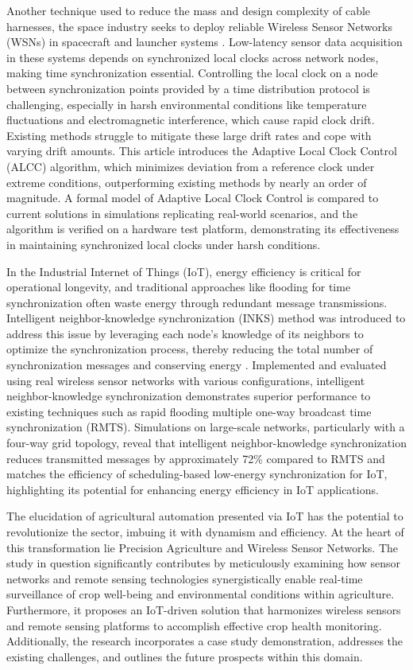 Another technique used to reduce the mass and design complexity of cable harnesses, the space industry seeks to deploy reliable Wireless Sensor Networks (WSNs) in spacecraft and launcher systems \cite{lubken2024adaptive}. Low-latency sensor data acquisition in these systems depends on synchronized local clocks across network nodes, making time synchronization essential. Controlling the local clock on a node between synchronization points provided by a time distribution protocol is challenging, especially in harsh environmental conditions like temperature fluctuations and electromagnetic interference, which cause rapid clock drift. Existing methods struggle to mitigate these large drift rates and cope with varying drift amounts. This article introduces the Adaptive Local Clock Control (ALCC) algorithm, which minimizes deviation from a reference clock under extreme conditions, outperforming existing methods by nearly an order of magnitude. A formal model of Adaptive Local Clock Control is compared to current solutions in simulations replicating real-world scenarios, and the algorithm is verified on a hardware test platform, demonstrating its effectiveness in maintaining synchronized local clocks under harsh conditions.

In the Industrial Internet of Things (IoT), energy efficiency is critical for operational longevity, and traditional approaches like flooding for time synchronization often waste energy through redundant message transmissions. Intelligent neighbor-knowledge synchronization (INKS) method was introduced to address this issue by leveraging each node's knowledge of its neighbors to optimize the synchronization process, thereby reducing the total number of synchronization messages and conserving energy \cite{jia2024low}. Implemented and evaluated using real wireless sensor networks with various configurations, intelligent neighbor-knowledge synchronization demonstrates superior performance to existing techniques such as rapid flooding multiple one-way broadcast time synchronization (RMTS). Simulations on large-scale networks, particularly with a four-way grid topology, reveal that intelligent neighbor-knowledge synchronization reduces transmitted messages by approximately 72\% compared to RMTS and matches the efficiency of scheduling-based low-energy synchronization for IoT, highlighting its potential for enhancing energy efficiency in IoT applications.

The elucidation of agricultural automation presented \cite{shafi2019precision} via IoT has the potential to revolutionize the sector, imbuing it with dynamism and efficiency. At the heart of this transformation lie Precision Agriculture and Wireless Sensor Networks. The study in question significantly contributes by meticulously examining how sensor networks and remote sensing technologies synergistically enable real-time surveillance of crop well-being and environmental conditions within agriculture. Furthermore, it proposes an IoT-driven solution that harmonizes wireless sensors and remote sensing platforms to accomplish effective crop health monitoring. Additionally, the research incorporates a case study demonstration, addresses the existing challenges, and outlines the future prospects within this domain.

